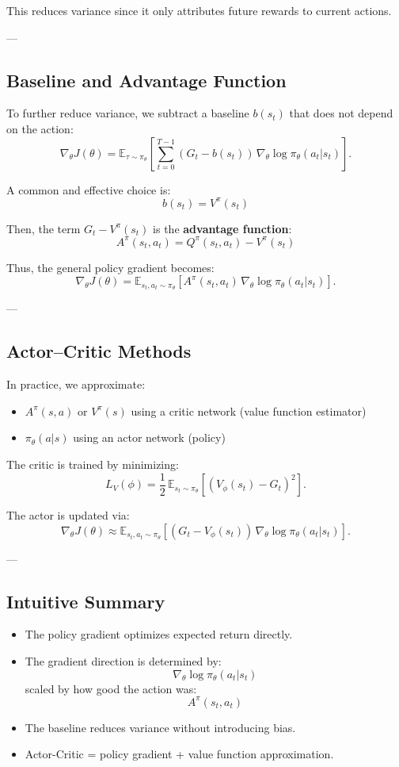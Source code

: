 \documentclass[12pt]{article}
\theoremstyle{definition} %
\theoremstyle{plain} %
\theoremstyle{remark} %
\begin{document}
\begin{CJK}{UTF8}{gbsn}
This reduces variance since it only attributes future rewards to current actions.

---

\subsection{Baseline and Advantage Function}

To further reduce variance, we subtract a baseline \(b(s_t)\) that does not depend on the action:
\[
\nabla_\theta J(\theta)
= \mathbb{E}_{\tau \sim \pi_\theta} \left[
\sum_{t=0}^{T-1} (G_t - b(s_t))\, \nabla_\theta \log \pi_\theta(a_t|s_t)
\right].
\]

A common and effective choice is:
\[
b(s_t) = V^\pi(s_t)
\]

Then, the term \(G_t - V^\pi(s_t)\) is the \textbf{advantage function}:
\[
A^\pi(s_t,a_t) = Q^\pi(s_t,a_t) - V^\pi(s_t)
\]

Thus, the general policy gradient becomes:
\[
\boxed{
\nabla_\theta J(\theta)
= \mathbb{E}_{s_t,a_t \sim \pi_\theta}
\left[ A^\pi(s_t,a_t)\, \nabla_\theta \log \pi_\theta(a_t|s_t) \right].
}
\]

---

\subsection{Actor–Critic Methods}

In practice, we approximate:
\begin{itemize}
    \item \(A^\pi(s,a)\) or \(V^\pi(s)\) using a critic network (value function estimator)
    \item \(\pi_\theta(a|s)\) using an actor network (policy)
\end{itemize}

The critic is trained by minimizing:
\[
L_V(\phi) = \frac{1}{2}\, \mathbb{E}_{s_t \sim \pi_\theta}
\left[ (V_\phi(s_t) - G_t)^2 \right].
\]

The actor is updated via:
\[
\nabla_\theta J(\theta)
\approx \mathbb{E}_{s_t,a_t \sim \pi_\theta}
\left[ (G_t - V_\phi(s_t))\, \nabla_\theta \log \pi_\theta(a_t|s_t) \right].
\]

---

\subsection{Intuitive Summary}

\begin{itemize}
    \item The policy gradient optimizes expected return directly.
    \item The gradient direction is determined by:
    \[
    \nabla_\theta \log \pi_\theta(a_t|s_t)
    \]
    scaled by how good the action was:
    \[
    A^\pi(s_t,a_t)
    \]
    \item The baseline reduces variance without introducing bias.
    \item Actor-Critic = policy gradient + value function approximation.
\end{itemize}


\end{CJK}
\end{document}
